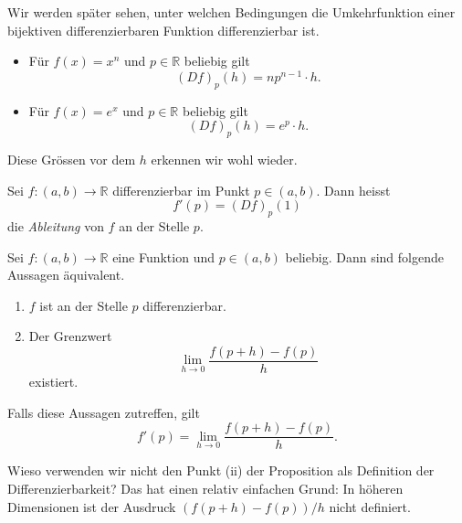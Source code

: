 \documentclass[../main.tex]{subfiles}
\begin{document}
Wir werden später sehen, unter welchen Bedingungen
die Umkehrfunktion einer bijektiven
differenzierbaren Funktion differenzierbar ist.

\begin{remarks}
  \leavevmode
  \begin{itemize}
\item
  Für $f(x) = x^n$ und $p \in \mathbb{R}$ beliebig
  gilt
  \[
    {(Df)}_p(h) = n p^{n-1} \cdot h.
  \]
\item
  Für $f(x) = e^x$ und $p \in \mathbb{R}$ beliebig gilt
  \[
    {(Df)}_p(h) = e^p \cdot h.
  \]
  \end{itemize}
  Diese Grössen vor dem $h$ erkennen wir
  wohl wieder.
\end{remarks}

\begin{definition}
  Sei $f \colon (a, b) \to \mathbb{R}$ differenzierbar
  im Punkt $p \in (a, b)$. Dann heisst
  \[
    f'(p) = {(Df)}_p(1)
  \]
  die \emph{Ableitung} von $f$ an der Stelle $p$.
\end{definition}

\begin{proposition*}
  Sei $f \colon (a, b) \to \mathbb{R}$ eine Funktion
  und $p \in (a, b)$ beliebig.
  Dann sind folgende Aussagen äquivalent.
  \begin{enumerate}[\normalfont(i)]
    \item $f$ ist an der Stelle $p$ differenzierbar.
    \item Der Grenzwert
      \[
        \lim_{h \to 0} \frac{f(p+h) - f(p)}{h}
      \]
      existiert.
  \end{enumerate}
  Falls diese Aussagen zutreffen, gilt
  \[
    f'(p) = \lim_{h \to 0} \frac{f(p + h) - f(p)}{h}.
  \]
\end{proposition*}

\begin{remark}
  Wieso verwenden wir nicht den Punkt (ii) der
  Proposition als Definition der Differenzierbarkeit?
  Das hat einen relativ einfachen Grund:
In höheren Dimensionen ist der Ausdruck
$(f(p + h) - f(p))/h$
nicht definiert.
\end{remark}
\end{document}
